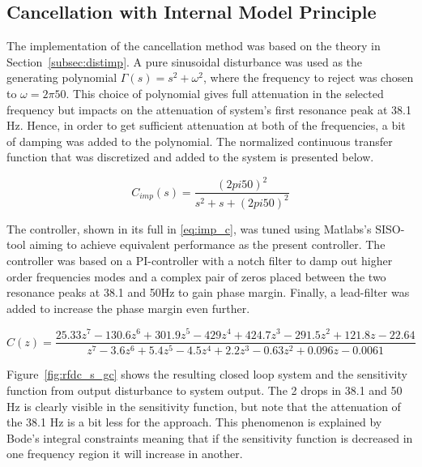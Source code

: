 \FloatBarrier
\subsection{Cancellation with Internal Model Principle}
The implementation of the \abbrIMP cancellation method was based on the theory in Section~\ref{subsec:distimp}. A pure sinusoidal disturbance was used as the generating polynomial $\Gamma(s) = s^2 + \omega^2$, where the frequency to reject was chosen to $\omega = 2\pi50$. This choice of polynomial gives full attenuation in the selected frequency but impacts on the attenuation of system's first resonance peak at 38.1 Hz. Hence, in order to get sufficient attenuation at both of the frequencies, a bit of damping was added to the polynomial. The normalized continuous transfer function that was discretized and added to the system is presented below.

\begin{equation}
  C_{imp}(s) = \frac{(2pi50)^2}{s^2 + s + (2pi50)^2}
\end{equation}

The controller, shown in its full in \eqref{eq:imp_c}, was tuned using Matlabs's SISO-tool aiming to achieve equivalent performance as the present controller. The controller was based on a PI-controller with a notch filter to damp out higher order frequencies modes and a complex pair of zeros placed between the two resonance peaks at 38.1 and 50Hz to gain phase margin. Finally, a lead-filter was added to increase the phase margin even further.

\begin{equation}
  \label{eq:imp_c}
  C(z) = \frac{25.33z^7 - 130.6z^6 + 301.9z^5 - 429z^4 + 424.7z^3 - 291.5z^2 + 121.8z - 22.64}{z^7 - 3.6z^6 + 5.4z^5 - 4.5z^4 + 2.2z^3 - 0.63z^2 + 0.096z - 0.0061}
\end{equation}




Figure~\ref{fig:rfdc_s_gc} shows the resulting closed loop system and the sensitivity function from output disturbance to system output. The 2 drops in 38.1 and 50 Hz is clearly visible in the sensitivity function, but note that the attenuation of the 38.1 Hz is a bit less for the \abbrIMP approach. This phenomenon is explained by Bode's integral constraints \citep{Ljung:2003} meaning that if the sensitivity function is decreased in one frequency region it will increase in another.

